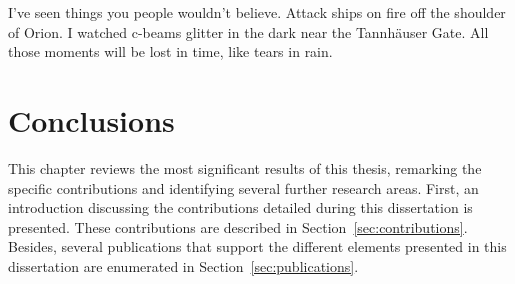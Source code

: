 

\begin{savequote}[50mm]
I've seen things you people wouldn't believe. Attack ships on fire off the 
shoulder of Orion. I watched c-beams glitter in the dark near the Tannhäuser Gate. 
All those moments will be lost in time, like tears in rain.
\end{savequote}


\chapter{Conclusions}
\label{cha:Conclusions}

\ifpdf
    \graphicspath{{6_conclusion/figures/PDF/}}
\fi

This chapter reviews the most significant results of this thesis, remarking the 
specific contributions and identifying several further research areas. First, 
an introduction discussing the contributions detailed during this dissertation 
is presented. These contributions are described in Section~\ref{sec:contributions}. 
Besides, several publications that support the different elements presented in 
this dissertation are enumerated in Section~\ref{sec:publications}.





